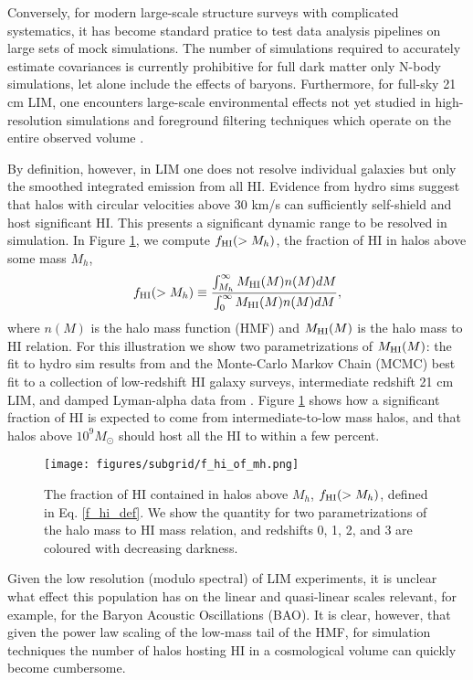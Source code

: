 Conversely, for modern large-scale structure surveys with complicated systematics, it has become standard pratice to test data analysis pipelines on large sets of mock simulations. The number of simulations required to accurately estimate covariances is currently prohibitive for full dark matter only N-body simulations, let alone include the effects of baryons. Furthermore, for full-sky 21 cm LIM, one encounters large-scale environmental effects not yet studied in high-resolution simulations \citep{pontzenbias, tidalsims} and foreground filtering techniques which operate on the entire observed volume \cite{ffska}.

By definition, however, in LIM one does not resolve individual galaxies but only the smoothed integrated emission from all HI. Evidence from hydro sims \cite{pontzen2008, bagla2010, vn2014, illustristng21cm} suggest that halos with circular velocities above 30 km/s can sufficiently self-shield and host significant HI. This presents a significant dynamic range to be resolved in simulation. In Figure \ref{f_hi_of_mh}, we compute $f_{\rm HI}(>M_h)$, the fraction of HI in halos above some mass $M_h$, 
\begin{equation}
f_{\rm HI}(>M_h) \equiv \frac{\int_{M_h}^\infty M_{\rm HI}(M) n(M) dM}{\int_0^\infty M_{\rm HI}(M) n(M) dM}, \label{f_hi_def}
\end{equation}
where $n(M)$ is the halo mass function (HMF) and $M_{\rm HI}(M)$ is the halo mass to HI relation. For this illustration we show two parametrizations of $M_{\rm HI}(M)$: the fit to hydro sim results from \citeauthor{illustristng21cm} and the Monte-Carlo Markov Chain (MCMC) best fit to a collection of low-redshift HI galaxy surveys, intermediate redshift 21 cm LIM, and damped Lyman-alpha data from \citeauthor{pad2016}. Figure \ref{f_hi_of_mh} shows how a significant fraction of HI is expected to come from intermediate-to-low mass halos, and that halos above $10^9 M_\odot$ should host all the HI to within a few percent.
\begin{figure}[h!] %
\begin{center}
\texttt{[image: figures/subgrid/f\_hi\_of\_mh.png]}%
\caption{The fraction of HI contained in halos above $M_h$, $f_{\rm HI}(>M_h)$, defined in Eq. \ref{f_hi_def}. We show the quantity for two parametrizations of the halo mass to HI mass relation, and redshifts 0, 1, 2, and 3 are coloured with decreasing darkness.}
\label{f_hi_of_mh}
\end{center}
\end{figure}
Given the low resolution (modulo spectral) of LIM experiments, it is unclear what effect this population has on the linear and quasi-linear scales relevant, for example, for the Baryon Acoustic Oscillations (BAO). It is clear, however, that given the power law scaling of the low-mass tail of the HMF, for simulation techniques the number of halos hosting HI in a cosmological volume can quickly become cumbersome.

